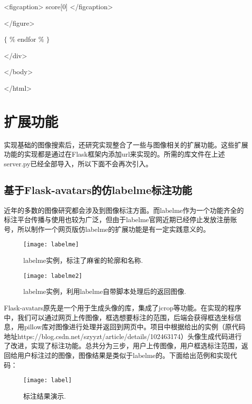\documentclass[bachelor_p]{hdu-thesis}
\begin{document}
<figcaption>{{ score[0] }}</figcaption>

</figure>

$\{$ $\%$ endfor $\%$ $\}$

</div>

</body>

</html>

\section {扩展功能}

实现基础的图像搜索后，还研究实现整合了一些与图像相关的扩展功能。这些扩展功能的实现都是通过在Flask框架内添加url来实现的。所需的库文件在上述server.py已经全部导入，所以下面不会再次引入。

\subsection {基于Flask-avatars的仿labelme标注功能}

近年的多数的图像研究都会涉及到图像标注方面。而labelme作为一个功能齐全的标注平台传播与使用也较为广泛，但由于labelme官网近期已经停止发放注册账号，所以制作一个网页版仿labelme的扩展功能是有一定实践意义的。

\begin{figure}[!htb]
  \centering
  \texttt{[image: labelme]}
  \caption{labelme实例，标注了麻雀的轮廓和名称.}
  \label{fig_labelme}
\end{figure}

\begin{figure}[!htb]
  \centering
  \texttt{[image: labelme2]}
  \caption{labelme实例，利用labelme自带脚本处理后的返回图像.}
  \label{fig_labelme2}
\end{figure}



Flask-avatars原先是一个用于生成头像的库，集成了jcrop等功能。在实现的程序中，我们可以通过网页上传图像，框选想要标注的范围，后端会获得框选坐标信息，用pillow库对图像进行处理并返回到网页中。项目中根据给出的实例（原代码地址https://blog.csdn.net/szyyzt/article/details/102463174）头像生成代码进行了改进，实现了标注功能。总共分为三步，用户上传图像，用户框选标注范围，返回给用户标注过的图像，图像结果是类似于labelme的。下面给出范例和实现代码：

\begin{figure}[!htb]
  \centering
  \texttt{[image: label]}
  \caption{标注结果演示.}
  \label{fig_label}
\end{figure}
\end{document}
